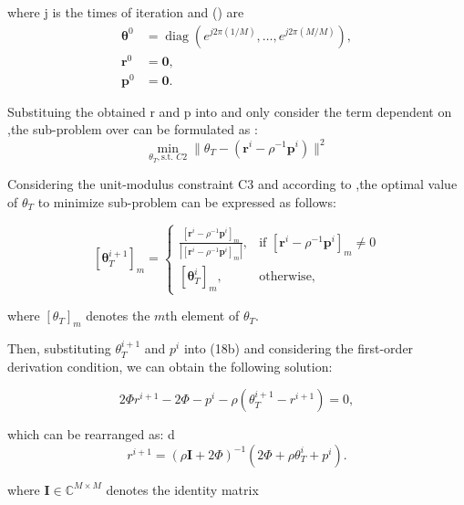 \documentclass[journal,comsoc]{IEEEtran}
\begin{document}
	
	
	
	where j is the times of iteration and () are
	\begin{align}
		\boldsymbol{\theta}^0 &= \operatorname{diag}\left(e^{j2\pi(1/M)}, \ldots, e^{j2\pi(M/M)}\right), \\
		\boldsymbol{r}^0 &= \mathbf{0}, \\
		\boldsymbol{p}^0 &= \mathbf{0}. \tag{19}
	\end{align}
	
	Substituing the obtained r and p  into and only consider the term dependent on ,the sub-problem over can be formulated as :
	   \begin{equation}  %
	   	\min_{\theta_T, \text{s.t. } C2} \|\theta_T - (\boldsymbol{r}^i - \rho^{-1} \boldsymbol{p}^i)\|^2
	   \end{equation}
	
	
	Considering the unit-modulus constraint C3 and according to ,the optimal value of $\theta_T$ to minimize sub-problem can be expressed as follows: 

	\[
	\left[ \boldsymbol{\theta}_T^{i+1} \right]_m = 
	\begin{cases} 
		\frac{\left[ \boldsymbol{r}^i - \rho^{-1} \boldsymbol{p}^i \right]_m}{\left| \left[ \boldsymbol{r}^i - \rho^{-1} \boldsymbol{p}^i \right]_m \right|}, & \text{if } \left[ \boldsymbol{r}^i - \rho^{-1} \boldsymbol{p}^i \right]_m \neq 0 \\
		\left[ \boldsymbol{\theta}_T^i \right]_m, & \text{otherwise},
	\end{cases}
	\tag{21}
	\]
	
	where $[\theta_T]_m$ denotes the $m$th element of $\theta_T$.
	
	Then, substituting $\theta_T^{i+1}$ and $p^i$ into (18b) and considering the first-order derivation condition, we can obtain the following solution:
	
	\begin{equation}
		2\Phi r^{i+1} - 2\Phi - p^i - \rho(\theta_T^{i+1} - r^{i+1}) = 0,
		\tag{22}
	\end{equation}
	
	which can be rearranged as:
	d
	\begin{equation}
		r^{i+1} = (\rho\mathbf{I} + 2\Phi)^{-1}(2\Phi + \rho\theta_T^i + p^i).
		\tag{23}
	\end{equation}
	
	where $\mathbf{I} \in \mathbb{C}^{M \times M}$ denotes the identity matrix
	  	
\end{document}
